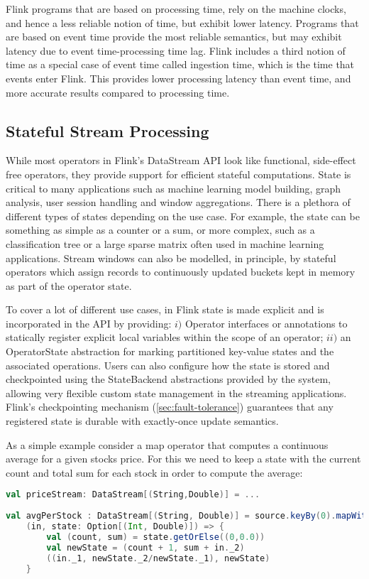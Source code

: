 Flink programs that are based on processing time, rely on the machine clocks, and hence a less reliable notion of time, but exhibit lower latency. Programs that are based on event time provide the most reliable semantics, but may exhibit latency due to event time-processing time lag. Flink includes a third notion of time as a special case of event time called ingestion time, which is the time that events enter Flink. This provides  lower processing latency than event time, and more accurate results compared to processing time.


\subsection{Stateful Stream Processing}
While most operators in Flink’s DataStream API look like functional, side-effect free operators, they provide support for efficient stateful computations. State is critical to many applications such as machine learning model building, graph analysis, user session handling and window aggregations. There is a plethora of different types of states depending on the use case. For example, the state can be something as simple as a counter or a sum, or more complex, such as a classification tree or a large sparse matrix often used in machine learning applications. Stream windows can also be modelled, in principle, by stateful operators which assign records to continuously updated buckets kept in memory as part of the operator state. 

To cover a lot of different use cases, in Flink state is made explicit and is incorporated in the API by providing: $i)$ Operator interfaces or annotations to statically register explicit local variables within the scope of an operator;  $ii)$ an OperatorState abstraction for marking partitioned key-value states and the associated operations. Users can also configure how the state is stored and checkpointed using the StateBackend abstractions provided by the system, allowing very flexible custom state management in the streaming applications. Flink’s checkpointing mechanism (\autoref{sec:fault-tolerance}) guarantees that any registered state is durable with exactly-once update semantics. 

As a simple example consider a map operator that computes a continuous average for a given stocks price. For this we need to keep a state with the current count and total sum for each stock in order to compute the average:

\begin{lstlisting}[language=Scala]
val priceStream: DataStream[(String,Double)] = ...
 
val avgPerStock : DataStream[(String, Double)] = source.keyBy(0).mapWithState(
    (in, state: Option[(Int, Double)]) => {
		val (count, sum) = state.getOrElse((0,0.0))
		val newState = (count + 1, sum + in._2)
		((in._1, newState._2/newState._1), newState)
	}
\end{lstlisting}

